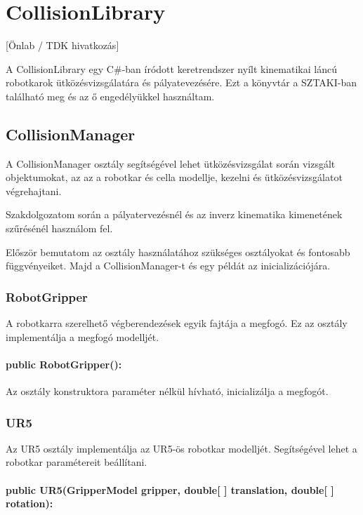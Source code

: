 \section{CollisionLibrary}
[Önlab / TDK hivatkozás]

A CollisionLibrary egy C\#-ban íródott keretrendszer nyílt kinematikai láncú robotkarok ütközésvizsgálatára és pályatevezésére. Ezt a könyvtár a SZTAKI-ban található meg és az ő engedélyükkel használtam. 

\subsection{CollisionManager}
A CollisionManager osztály segítségével lehet ütközésvizsgálat során vizsgált objektumokat, az az a robotkar és cella modellje, kezelni és ütközésvizsgálatot végrehajtani.

Szakdolgozatom során a pályatervezésnél és az inverz kinematika kimenetének szűrésénél használom fel.

Először bemutatom az osztály használatához szükséges osztályokat és fontosabb függvényeiket. Majd a CollisionManager-t és egy példát az inicializációjára. 

\subsubsection*{RobotGripper}

A robotkarra szerelhető végberendezések egyik fajtája a megfogó. Ez az osztály implementálja a megfogó modelljét.

\paragraph{public RobotGripper():}

 Az osztály konstruktora paraméter nélkül hívható, inicializálja a megfogót.

\subsubsection*{UR5}

Az UR5 osztály implementálja az UR5-ös robotkar modelljét. Segítségével lehet a robotkar paramétereit beállítani. 

\paragraph{public UR5(GripperModel gripper, double[ ] translation, double[ ] rotation):} 

